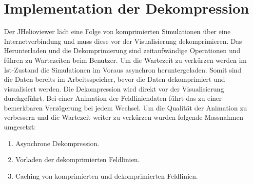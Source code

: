 \section{Implementation der Dekompression}
Der JHelioviewer lädt eine Folge von komprimierten Simulationen über eine Internetverbindung und muss diese vor der Visualisierung dekomprimieren. Das Herunterladen und die Dekomprimierung sind zeitaufwändige Operationen und führen zu Wartezeiten beim Benutzer. Um die Wartezeit zu verkürzen werden im Ist-Zustand die Simulationen im Voraus asynchron heruntergeladen. Somit sind die Daten bereits im Arbeitsspeicher, bevor die Daten dekomprimiert und visualisiert werden. Die Dekompression wird direkt vor der Visualisierung durchgeführt. Bei einer Animation der Feldliniendaten führt das zu einer bemerkbaren Verzögerung bei jedem Wechsel. Um die Qualität der Animation zu verbessern und die Wartezeit weiter zu verkürzen wurden folgende Massnahmen umgesetzt:
\begin{enumerate}
	\item Asynchrone Dekompression.
	\item Vorladen der dekomprimierten Feldlinien.
	\item Caching von komprimierten und dekomprimierten Feldlinien.
\end{enumerate}

